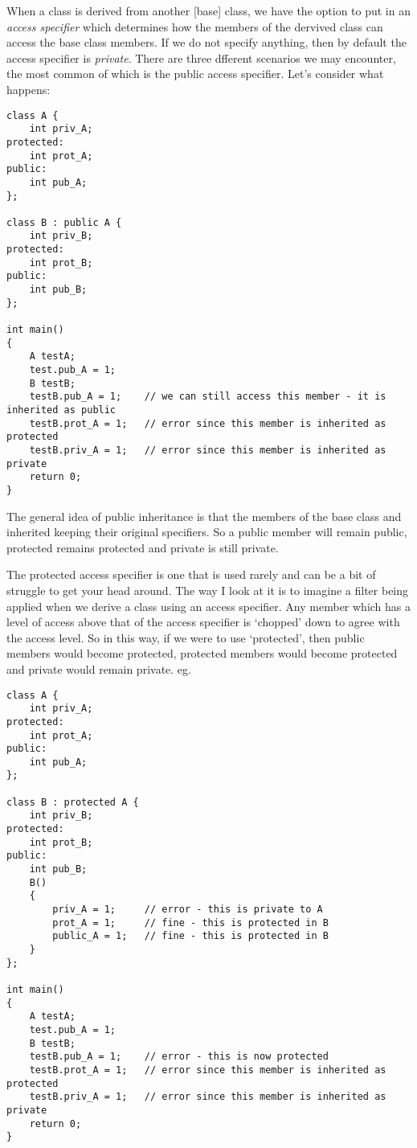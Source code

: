 When a class is derived from another [base] class, we have the option to put in an \emph{access specifier} which determines how the members of the dervived class can access the base class members. If we do not specify anything, then by default the access specifier is \emph{private}. There are three dfferent scenarios we may encounter, the most common of which is the public access specifier. Let's consider what happens:

\begin{lstlisting}
class A {
	int priv_A;
protected:
	int prot_A;
public:
	int pub_A;
};

class B : public A {
	int priv_B;
protected:
	int prot_B;
public:
	int pub_B;
};

int main()
{
	A testA;
	test.pub_A = 1;
	B testB;
	testB.pub_A = 1; 	// we can still access this member - it is inherited as public
	testB.prot_A = 1;	// error since this member is inherited as protected
	testB.priv_A = 1;	// error since this member is inherited as private
	return 0;
}	
\end{lstlisting}
The general idea of public inheritance is that the members of the base class and inherited keeping their original specifiers. So a public member will remain public, protected remains protected and private is still private.

The protected access specifier is one that is used rarely and can be a bit of struggle to get your head around. The way I look at it is to imagine a filter being applied when we derive a class using an access specifier. Any member which has a level of access above that of the access specifier is `chopped' down to agree with the access level. So in this way, if we were to use `protected', then public members would become protected, protected members would become protected and private would remain private. eg. 

\begin{lstlisting}
class A {
	int priv_A;
protected:
	int prot_A;
public:
	int pub_A;
};

class B : protected A {
	int priv_B;
protected:
	int prot_B;
public:
	int pub_B;
	B() 
	{
		priv_A = 1; 	// error - this is private to A
		prot_A = 1; 	// fine - this is protected in B
		public_A = 1; 	// fine - this is protected in B
	}
};

int main()
{
	A testA;
	test.pub_A = 1;
	B testB;
	testB.pub_A = 1; 	// error - this is now protected
	testB.prot_A = 1;	// error since this member is inherited as protected
	testB.priv_A = 1;	// error since this member is inherited as private
	return 0;
}	
\end{lstlisting}

